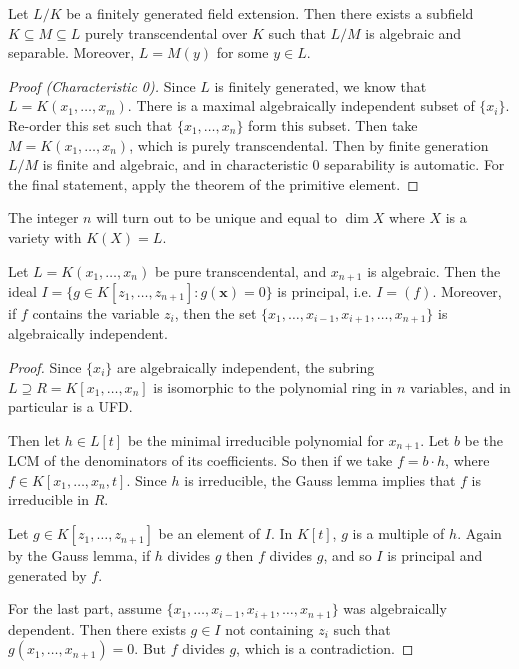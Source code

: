 \documentclass[10pt,a4paper,rgb]{article}
\begin{document}
\begin{proposition}
Let $L/K$ be a finitely generated field extension. Then there exists a subfield $K \subseteq M \subseteq L$ purely transcendental over $K$ such that $L/M$ is algebraic and separable. Moreover, $L = M(y)$ for some $y \in L$.
\end{proposition}
\begin{proof}[Proof (Characteristic 0)]
Since $L$ is finitely generated, we know that $L = K(x_1, \ldots, x_m)$. There is a maximal algebraically independent subset of $\{x_i\}$. Re-order this set such that $\{x_1,\ldots, x_n\}$ form this subset. Then take $M = K(x_1, \ldots, x_n)$, which is purely transcendental. Then by finite generation $L/M$ is finite and algebraic, and in characteristic 0 separability is automatic. For the final statement, apply the theorem of the primitive element.
\end{proof}
The integer $n$ will turn out to be unique and equal to $\dim X$ where $X$ is a variety with $K(X) = L$.
\begin{proposition}
Let $L = K(x_1, \ldots, x_n)$ be pure transcendental, and $x_{n+1}$ is algebraic. Then the ideal $I = \{g \in K[z_1, \ldots, z_{n+1}] : g(\mathbf{x}) = 0\}$ is principal, i.e. $I = (f)$. Moreover, if $f$ contains the variable $z_i$, then the set $\{x_1, \ldots, x_{i-1}, x_{i+1}, \ldots, x_{n+1}\}$ is algebraically independent.
\end{proposition}
\begin{proof}
Since $\{x_i\}$ are algebraically independent, the subring $L \supseteq R = K[x_1, \ldots, x_n]$ is isomorphic to the polynomial ring in $n$ variables, and in particular is a UFD.

Then let $h \in L[t]$ be the minimal irreducible polynomial for $x_{n+1}$. Let $b$ be the LCM of the denominators of its coefficients. So then if we take $f = b\cdot h$, where $f \in K[x_1, \ldots, x_n, t]$. Since $h$ is irreducible, the Gauss lemma implies that $f$ is irreducible in $R$.

Let $g \in K[z_1, \ldots, z_{n+1}]$ be an element of $I$. In $K[t]$, $g$ is a multiple of $h$. Again by the Gauss lemma, if $h$ divides $g$ then $f$ divides $g$, and so $I$ is principal and generated by $f$.

For the last part, assume $\{x_1, \ldots, x_{i-1}, x_{i+1}, \ldots, x_{n+1}\}$ was algebraically dependent. Then there exists $g \in I$ not containing $z_i$ such that $g(x_1, \ldots, x_{n+1}) = 0$. But $f$ divides $g$, which is a contradiction.
\end{proof}
\end{document}
